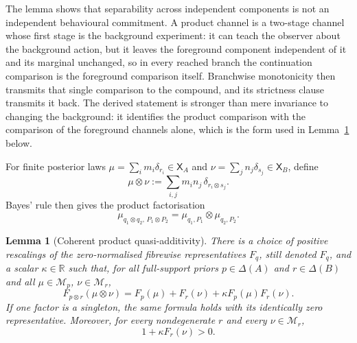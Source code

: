 \documentclass[11pt,a4paper]{article}
\newtheorem{lemma}[theorem]{Lemma}
\theoremstyle{definition}
\newcommand{\R}{\mathbb R}
\newcommand{\1}{\mathbf 1}
\begin{document}
The lemma shows that separability across independent components is not an independent behavioural commitment.  A product
channel is a two-stage channel whose first stage is the background experiment: it can teach the observer about the
background action, but it leaves the foreground component independent of it and its marginal unchanged, so in every
reached branch the continuation comparison is the foreground comparison itself.  Branchwise monotonicity then transmits
that single comparison to the compound, and its strictness clause transmits it back.  The derived statement is stronger
than mere invariance to changing the background: it identifies the product comparison with the comparison of the
foreground channels alone, which is the form used in Lemma~\ref{pt:lem:coherentnorm} below.

For finite posterior laws $\mu=\sum_i m_i\delta_{r_i}\in\mathsf X_A$ and
$\nu=\sum_j n_j\delta_{s_j}\in\mathsf X_B$, define
\[
\mu\otimes\nu
:=
\sum_{i,j}m_i n_j\,\delta_{r_i\otimes s_j}.
\]
Bayes' rule then gives the product factorisation
\begin{equation}
\mu_{q_1\otimes q_2,\,P_1\otimes P_2}
=
\mu_{q_1,P_1}\otimes\mu_{q_2,P_2}.
\tag{PL}\label{pt:eq:productlaw}
\end{equation}

\begin{lemma}[Coherent product quasi-additivity]\label{pt:lem:coherentnorm}
There is a choice of positive rescalings of the zero-normalised fibrewise representatives $F_q$, still denoted $F_q$,
and a scalar $\kappa\in\R$ such that, for all full-support priors $p\in\Delta(A)$ and $r\in\Delta(B)$ and all
$\mu\in\mathcal M_p$, $\nu\in\mathcal M_r$,
\begin{equation}
F_{p\otimes r}(\mu\otimes\nu)
=F_p(\mu)+F_r(\nu)+\kappa F_p(\mu)F_r(\nu).
\tag{QA}\label{pt:eq:QA}
\end{equation}
If one factor is a singleton, the same formula holds with its identically zero representative.  Moreover, for every
nondegenerate $r$ and every $\nu\in\mathcal M_r$,
\begin{equation}
1+\kappa F_r(\nu)>0.
\tag{POS}\label{pt:eq:QAslope}
\end{equation}
\end{lemma}
\end{document}
